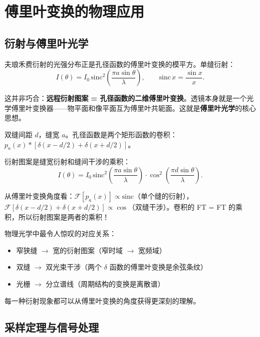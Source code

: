 \section{傅里叶变换的物理应用}
\label{sec:ft_physics}

\subsection{衍射与傅里叶光学}

夫琅禾费衍射的光强分布正是孔径函数的傅里叶变换的模平方。单缝衍射：
\begin{equation}
I(\theta) = I_0\,\mathrm{sinc}^2\!\left(\frac{\pi a\sin\theta}{\lambda}\right),
\qquad \mathrm{sinc}\,x = \frac{\sin x}{x}.
\end{equation}

这并非巧合：\textbf{远程衍射图案 = 孔径函数的二维傅里叶变换}。透镜本身就是一个光学傅里叶变换器——物平面和像平面互为傅里叶共轭面。这就是\textbf{傅里叶光学}的核心思想。

\begin{example}[双缝衍射]
双缝间距 $d$，缝宽 $a$。孔径函数是两个矩形函数的卷积：$p_a(x) * [\delta(x-d/2) + \delta(x+d/2)]$。

衍射图案是缝宽衍射和缝间干涉的乘积：
\begin{equation}
I(\theta) = I_0\,\mathrm{sinc}^2\!\left(\frac{\pi a\sin\theta}{\lambda}\right)
\cdot \cos^2\!\left(\frac{\pi d\sin\theta}{\lambda}\right).
\end{equation}

从傅里叶变换角度看：$\mathcal{F}[p_a(x)] \propto \mathrm{sinc}$（单个缝的衍射），$\mathcal{F}[\delta(x-d/2)+\delta(x+d/2)] \propto \cos$（双缝干涉）。卷积的 FT = FT 的乘积，所以衍射图案是两者的乘积！
\end{example}

\begin{insight}
物理光学中最令人惊叹的对应关系：
\begin{itemize}
\item 窄狭缝 $\to$ 宽的衍射图案（窄时域 $\to$ 宽频域）
\item 双缝 $\to$ 双光束干涉（两个 $\delta$ 函数的傅里叶变换是余弦条纹）
\item 光栅 $\to$ 分立谱线（周期结构的变换是离散谱）
\end{itemize}
每一种衍射现象都可以从傅里叶变换的角度获得更深刻的理解。
\end{insight}

\subsection{采样定理与信号处理}

